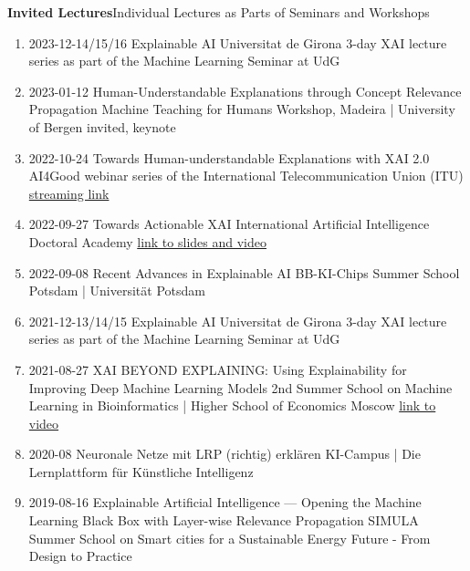 \headedsection
{\bf Invited Lectures}{Individual Lectures as Parts of Seminars and Workshops}
{
\begin{enumerate}
    \item {}
                    {2023-12-14/15/16}
                    {Explainable AI}
                    {Universitat de Girona}
                    {3-day XAI lecture series as part of the Machine Learning Seminar at UdG}
    \item {}
                    {2023-01-12}
                    {Human-Understandable Explanations through Concept Relevance Propagation}
                    {Machine Teaching for Humans Workshop, Madeira | University of Bergen}
                    {invited, keynote}
    \item {}
                    {2022-10-24}
                    {Towards Human-understandable Explanations with XAI 2.0}
                    {AI4Good webinar series of the International Telecommunication Union (ITU)}
                    {\href{https://www.youtube.com/watch?v=NiE13aBBx28}{streaming link}}
    \item {}
                    {2022-09-27}
                    {Towards Actionable XAI}
                    {International Artificial Intelligence Doctoral Academy}
                    {\href{https://www.i-aida.org/events/towards-actionable-xai-2/}{link to slides and video}}
    \item {}
                    {2022-09-08}
                    {Recent Advances in Explainable AI}
                    {BB-KI-Chips Summer School Potsdam | Universität Potsdam}
    \item {}
                    {2021-12-13/14/15}
                    {Explainable AI}
                    {Universitat de Girona}
                    {3-day XAI lecture series as part of the Machine Learning Seminar at UdG}
    \item {}
                    {2021-08-27}
                    {XAI BEYOND EXPLAINING: Using Explainability for Improving Deep Machine Learning Models}
                    {2nd Summer School on Machine Learning in Bioinformatics | Higher School of Economics Moscow}
                    {\href{https://www.youtube.com/watch?v=fHBSLzJ4zbA}{link to video}}
    \item {}
                    {2020-08}
                    {Neuronale Netze mit LRP (richtig) erklären}
                    {KI-Campus | Die Lernplattform für Künstliche Intelligenz}
    \item {}
                    {2019-08-16}
                    {Explainable Artificial Intelligence --- Opening the Machine Learning Black Box with Layer-wise Relevance Propagation}
                    {SIMULA Summer School on Smart cities for a Sustainable Energy Future - From Design to Practice}
\end{enumerate}
}